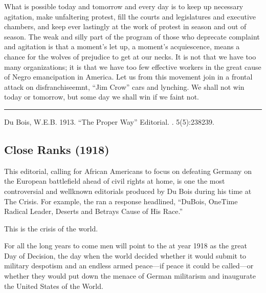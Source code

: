 \documentclass[letterpaper,10pt,english]{jupyterBook}
\begin{document}
\sphinxAtStartPar
What is possible to\sphinxhyphen{}day and tomorrow and every day is to keep up necessary agitation, make unfaltering protest, fill the courts and legislatures and executive chambers, and keep ever lastingly at the work of protest in season and out of season. The weak and silly part of the program of those who deprecate complaint and agitation is that a moment’s let up, a moment’s acquiescence, means a chance for the wolves of prejudice to get at our necks. It is not that we have too many organizations; it is that we have too few effective workers in the great cause of Negro emancipation in America. Let us from this movement join in a frontal attack on disfranchiseemnt, “Jim Crow” cars and lynching. We shall not win today or to\sphinxhyphen{}morrow, but some day we shall win if we faint not.


\bigskip\hrule\bigskip


\sphinxAtStartPar
{} Du Bois, W.E.B. 1913. “The Proper Way” Editorial. . 5(5):238\sphinxhyphen{}239.


\subsection{Close Ranks (1918)}
\label{\detokenize{Volumes/16/03/close_ranks:close-ranks-1918}}\label{\detokenize{Volumes/16/03/close_ranks::doc}}
\begin{sphinxShadowBox}
\sphinxstylesidebartitle{}

\sphinxAtStartPar
This editorial, calling for African Americans to focus on defeating Germany on the European battlefield ahead of civil rights at home, is one the most controversial and well\sphinxhyphen{}known editorials produced by Du Bois during his time at The Crisis. For example, the  ran a response headlined, “DuBois, One\sphinxhyphen{}Time Radical Leader, Deserts and Betrays Cause of His Race.”
\end{sphinxShadowBox}

\sphinxAtStartPar
This is the crisis of the world.

\sphinxAtStartPar
For all the long years to come men will point to the at year 1918 as the great Day of Decision, the day when the world decided whether it would submit to military despotism and an endless armed peace—if peace it could be called—or whether they would put down the menace of German militarism and inaugurate the United States of the World.
\end{document}
